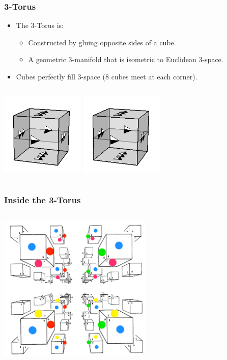 \documentclass[13pt]{beamer}
\begin{document}
\begin{frame}
\frametitle{3-Torus}
  \begin{itemize}
    \item The \alert{3-Torus} is:
          \begin{itemize}
             \item Constructed by gluing opposite sides of a cube.
             \item A geometric 3-manifold that is isometric to Euclidean 3-space.
           \end{itemize} 
    \item Cubes perfectly fill 3-space (8 cubes meet at each corner).
  \end{itemize}
  \begin{columns}[r] %
     \centering
     \includegraphics[height=4cm]{./img/cubegluing}
     \centering
     \includegraphics[height=4cm]{./img/cubegluing} %
  \end{columns}
\end{frame}

\begin{frame}
\frametitle{Inside the 3-Torus}
  \begin{columns}[c] %
     \centering
     \includegraphics[height=7cm]{./img/inside3torus}
  \end{columns}
\end{frame}
\end{document}
